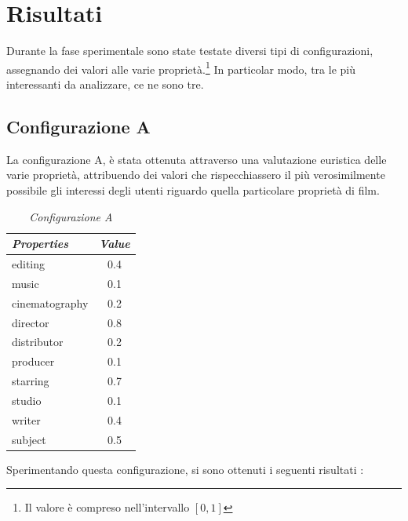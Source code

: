 \section{Risultati}
Durante la fase sperimentale sono state testate diversi tipi di configurazioni, assegnando dei valori alle varie proprietà.\footnote{Il valore è compreso nell'intervallo $[0,1]$} 
In particolar modo, tra le più interessanti da analizzare, ce ne sono tre.

\subsection{Configurazione A}
La configurazione A, è stata ottenuta attraverso una valutazione euristica delle varie proprietà, attribuendo dei valori che rispecchiassero il più verosimilmente possibile gli interessi degli utenti riguardo quella particolare proprietà di film.
\begin{table}[H]
\small
\centering
\begin{tabular}{l c}
\textit{Properties} & \textit{Value} \\\hline
editing & 0.4 \\
music & 0.1 \\
cinematography & 0.2 \\
director & 0.8 \\
distributor & 0.2 \\
producer & 0.1 \\
starring & 0.7 \\
studio & 0.1 \\
writer & 0.4 \\
subject & 0.5 \\
\end{tabular}
\caption{\emph{Configurazione A}}
\end{table}
Sperimentando questa configurazione, si sono ottenuti i seguenti risultati : 


\setlength{\tabcolsep}{12pt}

